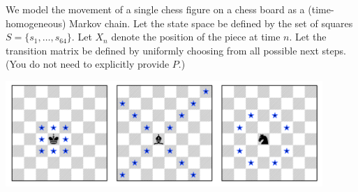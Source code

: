 
\question We model the movement of a single chess figure on a chess board as a (time-homogeneous) Markov chain. Let the state space be defined by the set of squares $S = \{s_1, \ldots, s_{64}\}$. Let $X_n$ denote the position of the piece at time $n$. Let the transition matrix be defined by uniformly choosing from all possible next steps. (You do not need to explicitly provide $P$.)

\begin{center}
    \includegraphics[width=0.9\textwidth]{img1.png}
\end{center}

